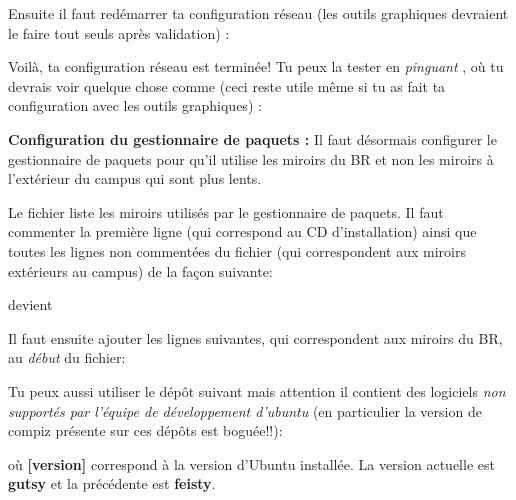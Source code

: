 Ensuite il faut red\'emarrer ta configuration r\'eseau (les outils graphiques devraient le faire tout seuls apr\`es validation) :


Voil\`a, ta configuration r\'eseau est termin\'ee! Tu peux la tester en \emph{pinguant} \fkz, o\`u tu devrais voir quelque chose comme (ceci reste utile m\^eme si tu
as fait ta configuration avec les outils graphiques) :


\label{ubuntu_mirror} {\bf Configuration du gestionnaire de paquets
:} Il faut d\'esormais configurer le gestionnaire de paquets pour
qu'il utilise les miroirs du BR et non les miroirs \`a l'ext\'erieur du
campus qui sont plus lents.

Le fichier  liste les miroirs utilis\'es par le gestionnaire de paquets. Il faut commenter la premi\`ere ligne (qui
correspond au CD d'installation) ainsi que toutes les lignes non comment\'ees du fichier (qui correspondent aux miroirs ext\'erieurs au campus) de la
fa\c{c}on suivante:


devient


Il faut ensuite ajouter les lignes suivantes, qui correspondent aux miroirs du BR, au \emph{d\'ebut} du fichier:


Tu peux aussi utiliser le d\'ep\^ot suivant mais attention il contient des logiciels \emph{non support\'es par l'\'equipe de d\'eveloppement d'ubuntu} (en particulier la version de compiz pr\'esente
sur ces d\'ep\^ots est bogu\'ee!!):


o\`u \textbf{[version]} correspond \`a la version d'Ubuntu install\'ee. La version actuelle est \textbf{gutsy} et la pr\'ec\'edente est \textbf{feisty}.


